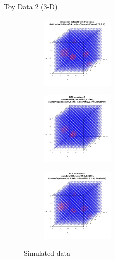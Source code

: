 \documentclass[10pt,mathserif]{beamer}
\begin{document}
\begin{frame}{Toy Data 2 (3-D)}
\begin{figure}[t!]
    \centering
    \begin{subfigure}[t]{0.3\textwidth}
        \centering
        \includegraphics[height=1.4in, width=1.4in]{../simulation_data3.jpg}
        \caption{}
    \end{subfigure}%
    \begin{subfigure}[t]{0.3\textwidth}
        \centering
        \includegraphics[height=1.4in, width=1.4in]{../dataset3beta3.jpg}
        \caption{}
    \end{subfigure}%
        \begin{subfigure}[t]{0.3\textwidth}
        \centering
        \includegraphics[height=1.4in, width=1.4in]{../best3.jpg}
        \caption{}
    \end{subfigure}
    \caption{Simulated data}
\end{figure}
\end{frame}
\end{document}
